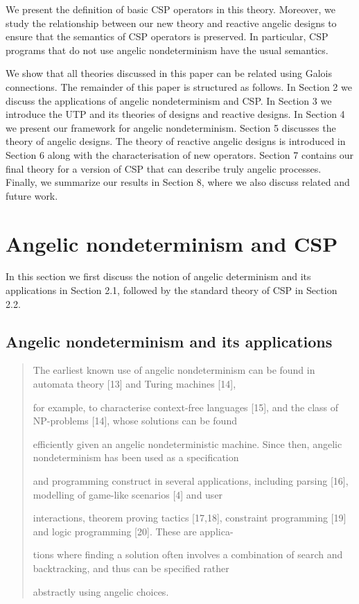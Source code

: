 \documentclass[11pt]{article}
\begin{document}
We present the definition of basic CSP operators in this theory. Moreover, we study the relationship between our new theory and reactive angelic designs to ensure that the semantics of CSP operators is preserved. In particular, CSP programs that do not use angelic nondeterminism have the usual semantics.

We show that all theories discussed in this paper can be related using Galois connections. The remainder of this paper is structured as follows. In Section 2 we discuss the applications of angelic nondeterminism and CSP. In Section 3 we introduce the UTP and its theories of designs and reactive designs. In Section 4 we present our framework for angelic nondeterminism. Section 5 discusses the theory of angelic designs. The theory of reactive angelic designs is introduced in Section 6 along with the characterisation of new operators. Section 7 contains our final theory for a version of CSP that can describe truly angelic processes. Finally, we summarize our results in Section 8, where we also discuss related and future work.

\section{Angelic nondeterminism and CSP}
In this section we first discuss the notion of angelic determinism and its applications in Section 2.1, followed by the standard theory of CSP in Section 2.2.

\subsection{Angelic nondeterminism and its applications}
\begin{quote}\small\raggedright
The earliest known use of angelic nondeterminism can be found in automata theory [13] and Turing machines [14],
\par
for example, to characterise context-free languages [15], and the class of NP-problems [14], whose solutions can be found
\par
efficiently given an angelic nondeterministic machine. Since then, angelic nondeterminism has been used as a specification
\par
and programming construct in several applications, including parsing [16], modelling of game-like scenarios [4] and user
\par
interactions, theorem proving tactics [17,18], constraint programming [19] and logic programming [20]. These are applica-
\par
tions where finding a solution often involves a combination of search and backtracking, and thus can be specified rather
\par
abstractly using angelic choices.
\end{quote}
\end{document}
